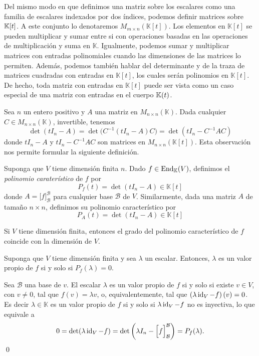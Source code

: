 \begin{obs}
Del mismo modo en que definimos una matriz sobre los escalares como una familia de escalares indexados por dos índices, podemos definir matrices sobre $\mathbb{K}[t]$. A este conjunto lo denotaremos $M_{m\times n}(\mathbb{K}[t])$. Los elementos en $\mathbb{K}[t]$ se pueden multiplicar y sumar entre si con operaciones basadas en las operaciones de multiplicaci\'on y suma en $\mathbb{K}$. Igualmente, podemos sumar y multiplicar matrices con entradas polinomiales cuando las dimensiones de las matrices lo permiten. Además, podemos también hablar del determinante y de la traza de matrices cuadradas con entradas en $\mathbb{K}[t]$, los cuales ser\'an polinomios en $\mathbb{K}[t]$. De hecho, toda matriz con entradas en $\mathbb{K}[t]$ puede ser vista como un caso especial de una matriz con entradas en el cuerpo $\mathbb{K}(t)$.
\end{obs}

\begin{obs}
Sea $n$ un entero positivo y $A$ una matriz en $M_{n\times n}(\mathbb{K})$. Dada cualquier $C\in M_{n\times n}(\mathbb{K})$, invertible, tenemos
\[
\det(t I_n-A)=\det\Big(C^{-1}(t I_n-A)C\Big)=\det(t I_n-C^{-1}AC)
\]
donde $t I_n-A$ y $t I_n-C^{-1}AC$ son matrices en $M_{n\times n}(\mathbb{K}[t])$. Esta observaci\'on nos permite formular la siguiente definici\'on.
\end{obs}

\begin{defn}
Suponga que $V$ tiene dimensi\'on finita $n$. Dado $f\in\operatorname{End}_\mathbb{K}(V)$, definimos el \emph{polinomio carater\'istico} de $f$ por
\[
P_f(t)=\det(t I_n-A)\in \mathbb{K}[t]
\]
donde $A=\Big[f\Big]^{\mathcal{B}}_{\mathcal{B}}$ para cualquier base $\mathcal{B}$ de $V$. Similarmente, dada una matriz $A$ de tamaño $n\times n$, definimos su polinomio característico por
\[
P_A(t)=\det(t I_n-A)\in \mathbb{K}[t]
\]
\end{defn}

\begin{obs}
  Si $V$ tiene dimensión finita, entonces el grado del polinomio característico de $f$ coincide con la dimensión de $V$.
\end{obs}

\begin{teo}
Suponga que $V$ tiene dimensi\'on finita y sea $\lambda$ un escalar. Entonces, $\lambda$ es un valor propio de $f$ si y solo si $P_f(\lambda)=0$.
\end{teo}

\dem Sea $\mathcal{B}$ una base de $v$. El escalar $\lambda$ es un valor propio de $f$ si y solo si existe $v\in V$, con $v\ne 0$, tal que $f(v)=\lambda v$, o, equivalentemente, tal que $\left(\lambda\operatorname{id}_V-f\right)(v)=0$. Es decir $\lambda\in \mathbb{K}$ es un valor propio de $f$ si y solo si $\lambda\operatorname{id}_V-f$ no es inyectiva, lo que equivale a
\[
0=\det(\lambda\operatorname{id}_V-f)=\det\left(\lambda I_n-\Big[f\Big]^{\mathcal{B}}_{\mathcal{B}}\right)=P_f(\lambda).
\]
\qed

